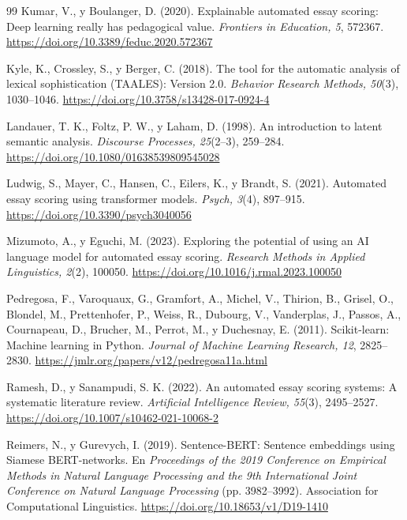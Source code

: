 \documentclass[11pt,a4paper]{article}
\begin{document}
\begin{thebibliography}{99}
Kumar, V., y Boulanger, D. (2020). Explainable automated essay scoring: Deep learning really has pedagogical value. \textit{Frontiers in Education, 5}, 572367. \url{https://doi.org/10.3389/feduc.2020.572367}

Kyle, K., Crossley, S., y Berger, C. (2018). The tool for the automatic analysis of lexical sophistication (TAALES): Version 2.0. \textit{Behavior Research Methods, 50}(3), 1030--1046. \url{https://doi.org/10.3758/s13428-017-0924-4}

Landauer, T. K., Foltz, P. W., y Laham, D. (1998). An introduction to latent semantic analysis. \textit{Discourse Processes, 25}(2--3), 259--284. \url{https://doi.org/10.1080/01638539809545028}

Ludwig, S., Mayer, C., Hansen, C., Eilers, K., y Brandt, S. (2021). Automated essay scoring using transformer models. \textit{Psych, 3}(4), 897--915. \url{https://doi.org/10.3390/psych3040056}

Mizumoto, A., y Eguchi, M. (2023). Exploring the potential of using an AI language model for automated essay scoring. \textit{Research Methods in Applied Linguistics, 2}(2), 100050. \url{https://doi.org/10.1016/j.rmal.2023.100050}

Pedregosa, F., Varoquaux, G., Gramfort, A., Michel, V., Thirion, B., Grisel, O., Blondel, M., Prettenhofer, P., Weiss, R., Dubourg, V., Vanderplas, J., Passos, A., Cournapeau, D., Brucher, M., Perrot, M., y Duchesnay, E. (2011). Scikit-learn: Machine learning in Python. \textit{Journal of Machine Learning Research, 12}, 2825--2830. \url{https://jmlr.org/papers/v12/pedregosa11a.html}

Ramesh, D., y Sanampudi, S. K. (2022). An automated essay scoring systems: A systematic literature review. \textit{Artificial Intelligence Review, 55}(3), 2495--2527. \url{https://doi.org/10.1007/s10462-021-10068-2}

Reimers, N., y Gurevych, I. (2019). Sentence-BERT: Sentence embeddings using Siamese BERT-networks. En \textit{Proceedings of the 2019 Conference on Empirical Methods in Natural Language Processing and the 9th International Joint Conference on Natural Language Processing} (pp. 3982--3992). Association for Computational Linguistics. \url{https://doi.org/10.18653/v1/D19-1410}


\end{thebibliography}
\end{document}
